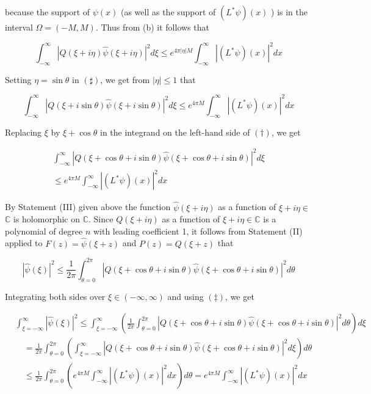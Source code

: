 \documentclass[10pt]{article}
\begin{document}
because the support of $\psi(x)$ (as well as the support of $\left(L^{*} \psi\right)(x)$ ) is in the interval $\Omega=(-M, M)$. Thus from (b) it follows that

$$
\int_{-\infty}^{\infty}|Q(\xi+i \eta) \hat{\psi}(\xi+i \eta)|^{2} d \xi \leq e^{4 \pi|\eta| M} \int_{-\infty}^{\infty}\left|\left(L^{*} \psi\right)(x)\right|^{2} d x
$$

Setting $\eta=\sin \theta$ in $(\sharp)$, we get from $|\eta| \leq 1$ that

$$
\int_{-\infty}^{\infty}|Q(\xi+i \sin \theta) \hat{\psi}(\xi+i \sin \theta)|^{2} d \xi \leq e^{4 \pi M} \int_{-\infty}^{\infty}\left|\left(L^{*} \psi\right)(x)\right|^{2} d x
$$

Replacing $\xi$ by $\xi+\cos \theta$ in the integrand on the left-hand side of $(\dagger)$, we get

$$
\begin{gathered}
\int_{-\infty}^{\infty}|Q(\xi+\cos \theta+i \sin \theta) \hat{\psi}(\xi+\cos \theta+i \sin \theta)|^{2} d \xi \\
\leq e^{4 \pi M} \int_{-\infty}^{\infty}\left|\left(L^{*} \psi\right)(x)\right|^{2} d x
\end{gathered}
$$

By Statement (III) given above the function $\hat{\psi}(\xi+i \eta)$ as a function of $\xi+i \eta \in$ $\mathbb{C}$ is holomorphic on $\mathbb{C}$. Since $Q(\xi+i \eta)$ as a function of $\xi+i \eta \in \mathbb{C}$ is a polynomial of degree $n$ with leading coefficient 1, it follows from Statement (II) applied to $F(z)=\hat{\psi}(\xi+z)$ and $P(z)=Q(\xi+z)$ that

$$
|\hat{\psi}(\xi)|^{2} \leq \frac{1}{2 \pi} \int_{\theta=0}^{2 \pi}|Q(\xi+\cos \theta+i \sin \theta) \hat{\psi}(\xi+\cos \theta+i \sin \theta)|^{2} d \theta
$$

Integrating both sides over $\xi \in(-\infty, \infty)$ and using $(\ddagger)$, we get

$$
\begin{aligned}
& \int_{\xi=-\infty}^{\infty}|\hat{\psi}(\xi)|^{2} \leq \int_{\xi=-\infty}^{\infty}\left(\frac{1}{2 \pi} \int_{\theta=0}^{2 \pi}|Q(\xi+\cos \theta+i \sin \theta) \hat{\psi}(\xi+\cos \theta+i \sin \theta)|^{2} d \theta\right) d \xi \\
& \quad=\frac{1}{2 \pi} \int_{\theta=0}^{2 \pi}\left(\int_{\xi=-\infty}^{\infty}|Q(\xi+\cos \theta+i \sin \theta) \hat{\psi}(\xi+\cos \theta+i \sin \theta)|^{2} d \xi\right) d \theta \\
& \quad \leq \frac{1}{2 \pi} \int_{\theta=0}^{2 \pi}\left(e^{4 \pi M} \int_{-\infty}^{\infty}\left|\left(L^{*} \psi\right)(x)\right|^{2} d x\right) d \theta=e^{4 \pi M} \int_{-\infty}^{\infty}\left|\left(L^{*} \psi\right)(x)\right|^{2} d x
\end{aligned}
$$
\end{document}
